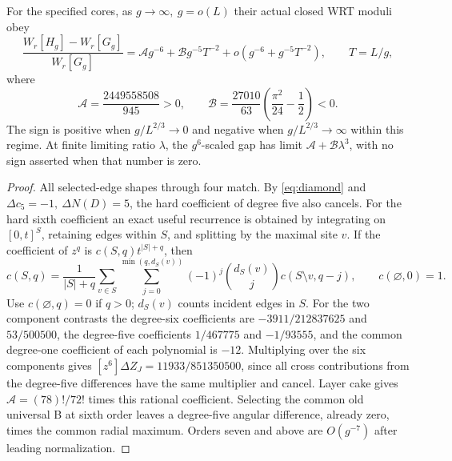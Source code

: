 \begin{theorem}\label{thm:reversal}
For the specified cores, as \(g\to\infty,\ g=o(L)\) their actual closed WRT moduli obey
\[
 \frac{W_r[H_g]-W_r[G_g]}{W_r[G_g]}
 =\mathcal A g^{-6}+\mathcal B g^{-5}T^{-2}
    +o(g^{-6}+g^{-5}T^{-2}),\qquad T=L/g,
\]
where
\[
 \mathcal A=\frac{2449558508}{945}>0,\qquad
 \mathcal B=\frac{27010}{63}\left(\frac{\pi^2}{24}-\frac12\right)<0 .
\]
The sign is positive when \(g/L^{2/3}\to0\) and negative when \(g/L^{2/3}\to\infty\) within this regime. At finite limiting ratio \(\lambda\), the \(g^6\)-scaled gap has limit \(\mathcal A+\mathcal B\lambda^3\), with no sign asserted when that number is zero.
\end{theorem}

\begin{proof}
All selected-edge shapes through four match. By \eqref{eq:diamond} and \(\Delta c_5=-1,\ \Delta N(D)=5\), the hard coefficient of degree five also cancels. For the hard sixth coefficient an exact useful recurrence is obtained by integrating on \([0,t]^S\), retaining edges within \(S\), and splitting by the maximal site \(v\). If the coefficient of \(z^q\) is \(c(S,q)t^{|S|+q}\), then
\[
 c(S,q)=\frac1{|S|+q}\sum_{v\in S}\sum_{j=0}^{\min(q,d_S(v))}
             (-1)^j\binom{d_S(v)}j c(S\setminus v,q-j),\qquad c(\varnothing,0)=1 .
\]
Use \(c(\varnothing,q)=0\) if \(q>0\); \(d_S(v)\) counts incident edges in \(S\). For the two component contrasts the degree-six coefficients are \(-3911/212837625\) and \(53/500500\), the degree-five coefficients \(1/467775\) and \(-1/93555\), and the common degree-one coefficient of each polynomial is \(-12\). Multiplying over the six components gives \([z^6]\Delta Z_J=11933/851350500\), since all cross contributions from the degree-five differences have the same multiplier and cancel. Layer cake gives \(\mathcal A=(78)!/72!\) times this rational coefficient. Selecting the common old universal B at sixth order leaves a degree-five angular difference, already zero, times the common radial maximum. Orders seven and above are \(O(g^{-7})\) after leading normalization.


\end{proof}
